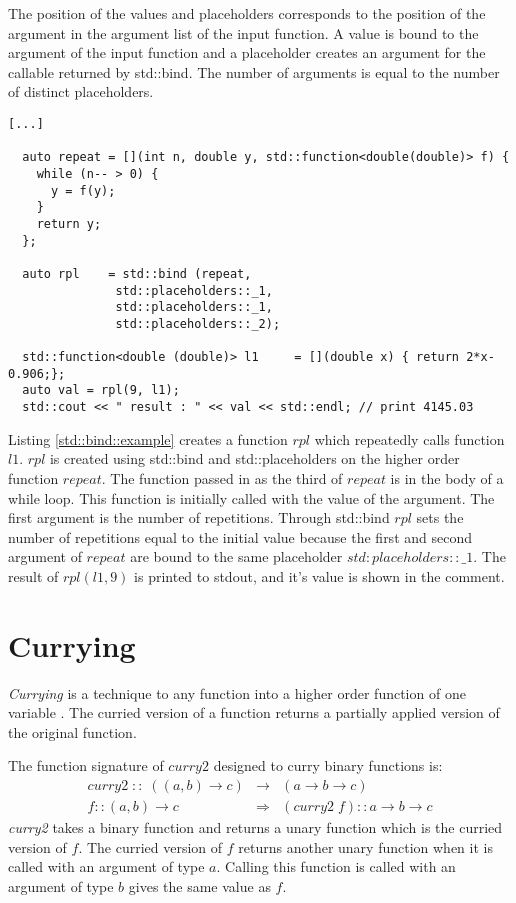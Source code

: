 \documentclass[12pt,fleqn]{article}
\begin{document}
The position of the values and placeholders corresponds to the position of the argument in the argument list of the input function. 
A value is bound to the argument of the input function and a placeholder creates an argument for the callable returned by std::bind.
The number of arguments is equal to the number of distinct placeholders.
%
\begin{lstlisting}[caption=std::bind example, label=std::bind::example]
[...]
 
  auto repeat = [](int n, double y, std::function<double(double)> f) { 
    while (n-- > 0) {
      y = f(y);
    }
    return y;
  };

  auto rpl    = std::bind (repeat,
			   std::placeholders::_1,
			   std::placeholders::_1,
			   std::placeholders::_2);

  std::function<double (double)> l1     = [](double x) { return 2*x-0.906;};
  auto val = rpl(9, l1);
  std::cout << " result : " << val << std::endl; // print 4145.03

\end{lstlisting}
%
Listing \ref{std::bind::example} creates a function $rpl$ which repeatedly calls function $l1$. 
$rpl$ is created using std::bind and std::placeholders on the higher order function $repeat$.
The function passed in as the third of $repeat$ is in the body of a while loop. 
This function is initially called with the value of the  argument.
The first argument is the number of repetitions.
Through std::bind $rpl$ sets the number of repetitions equal to the initial value because the first and second argument of $repeat$ are bound to the same placeholder $std:placeholders::\_1$. 
The result of $rpl(l1,9)$  is printed to stdout, and it's value is shown in the comment.
\section*{Currying}
{\em Currying} is a technique to any function into a higher order function of one variable \cite{field}.
The curried version of a function returns a partially applied version of the original function.

The function signature of $curry2$ designed to curry binary functions is:
\begin{eqnarray*}
curry2 \; :: \; ((a,b) \rightarrow c) &\rightarrow& (a \rightarrow b \rightarrow c) \\
f::(a,b) \rightarrow c &\Rightarrow&  (curry2\;f)::a \rightarrow b \rightarrow c 
\end{eqnarray*}
{\em curry2} takes a binary function and returns a unary function which is the curried version of $f$.
The curried version of $f$ returns another unary function when it is called with an argument of type $a$.
Calling this function is called with an argument of type $b$ gives the same value as $f$.
\end{document}
